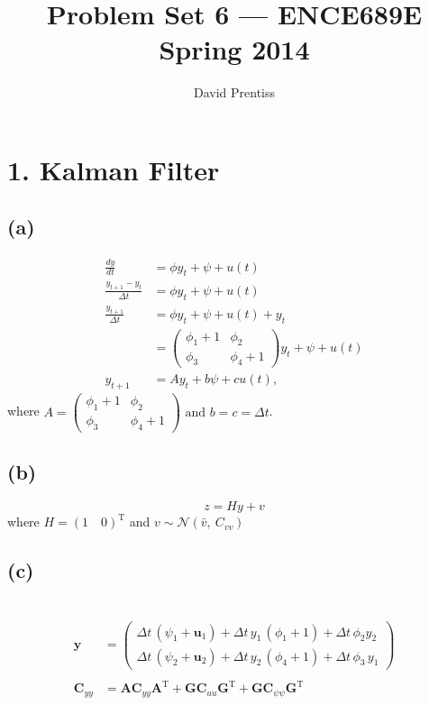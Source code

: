 \documentclass[fleqn, letterpaper]{tufte-handout}
\title{Problem Set 6 --- ENCE689E Spring 2014}
\author{David Prentiss}
\newcommand{\T}{^\text{T}}
\newcommand{\y}{\mathbf{y}}
\newcommand{\A}{\mathbf{A}}
\newcommand{\GG}{\mathbf{G}}
\newcommand{\uu}{\mathbf{u}}
\newcommand{\cyy}{\mathbf{C}_{yy}}
\newcommand{\cuu}{\mathbf{C}_{uu}}
\newcommand{\cpp}{\mathbf{C}_{\psi\psi}}
\begin{document}
\maketitle

\section{1. Kalman Filter}
\subsection{(a)}
\begin{align*}
        \frac{dy}{dt} &= \phi y_t + \psi + u(t) \\
        \frac{y_{t+1}-y_t}{\Delta t} &= \phi y_t + \psi + u(t) \\
        \frac{y_{t+1}}{\Delta t} &= \phi y_t + \psi + u(t) + y_t\\
                                 &= \begin{pmatrix} \phi_1+1 & \phi_2 \\ \phi_3 &\phi_4+1\end{pmatrix} y_t + \psi + u(t)\\
        y_{t+1} &= Ay_t + b\psi + cu(t),
\end{align*}
where $A = \begin{pmatrix} \phi_1+1 & \phi_2 \\ \phi_3 &\phi_4+1\end{pmatrix}\text{ and } b = c = \Delta t
$.

\subsection{(b)}
\[z = Hy + v\]
where $ H = (1\quad 0)\T $ and $v\sim\mathcal{N}(\bar{v},\ C_{vv})$

\subsection{(c)}
\begin{align*}
\end{align*}

\begin{align*}
\y &= \left(\begin{array}{c} \Delta t\, \left(\psi_1+ \uu_1\right) + \Delta t\, y_1\, \left(\phi_1 + 1\right) + \Delta t\, \phi_2 y_2\\ \Delta t\, \left(\psi_2 + \uu_2\right) + \Delta t\, y_2\, \left(\phi_4 + 1\right) + \Delta t\, \phi_3\, y_1 \end{array}\right) \\ \\
\cyy &= \A\cyy\A\T + \GG\cuu\GG\T + \GG\cpp\GG\T
\end{align*}
\end{document}
